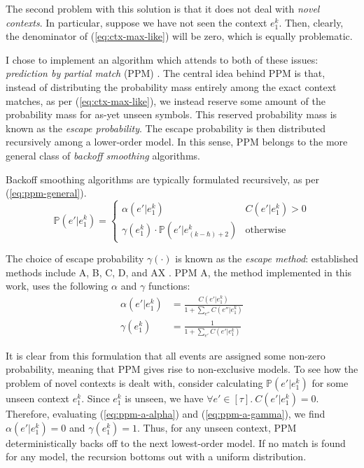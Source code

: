 \documentclass[12pt,a4paper,twoside,openright]{report}
\begin{document}
The second problem with this solution is that it does not deal with \emph{novel
contexts}. In particular, suppose we have not seen the context $e_1^k$. Then,
clearly, the denominator of (\ref{eq:ctx-max-like}) will be zero, which is
equally problematic.

I chose to implement an algorithm which attends to both of these issues:
\emph{prediction by partial match} (PPM) \cite{cleary1984ppm}. The central idea
behind PPM is that, instead of distributing the probability mass entirely among
the exact context matches, as per (\ref{eq:ctx-max-like}), we instead reserve
some amount of the probability mass for as-yet unseen symbols. This reserved
probability mass is known as the \emph{escape probability}. The escape
probability is then distributed recursively among a lower-order model. In this
sense, PPM belongs to the more general class of \emph{backoff smoothing}
algorithms.

Backoff smoothing algorithms are typically formulated recursively, as per
(\ref{eq:ppm-general}).
\begin{equation}\label{eq:ppm-general}
  \mathbb{P}(e' | e_1^k) = \begin{cases}
  \alpha(e'|e_1^k) & C(e' | e_1^k) > 0 \\
\gamma(e_1^k) \cdot \mathbb{P}(e' | e_{(k - \hbar) + 2}^k) & \text{otherwise}
\end{cases} 
\end{equation} 

The choice of escape probability $\gamma(\cdot)$ is known
as the \emph{escape method}: established methods include A, B, C, D, and AX
\cite{pearce2004improved}. PPM A, the method implemented in this work, uses the
following $\alpha$ and $\gamma$ functions:
\begin{align}
  \label{eq:ppm-a-alpha}
  \alpha(e' | e_1^k) &= \frac{ C(e' | e_1^k) }{ 1 + \sum_{e''} C(e'' | e_1^k) }
  \\
  \gamma(e_1^k) &= \frac{ 1 }{ 1 + \sum_{e'} C(e' | e_1^k) }
  \label{eq:ppm-a-gamma}
\end{align}

It is clear from this formulation that all events are assigned some non-zero
probability, meaning that PPM gives rise to non-exclusive models. To see how the
problem of novel contexts is dealt with, consider calculating $\mathbb{P}(e' |
e_1^k)$ for some unseen context $e_1^k$. Since $e_1^k$ is unseen, we have
$\forall e' \in [\tau].\ C(e' | e_1^k) = 0$. Therefore, evaluating
(\ref{eq:ppm-a-alpha}) and (\ref{eq:ppm-a-gamma}), we find $\alpha(e'|e_1^k) =
0$ and $\gamma(e_1^k) = 1$. Thus, for any unseen context, PPM deterministically
backs off to the next lowest-order model. If no match is found for any model,
the recursion bottoms out with a uniform distribution. 
\end{document}
